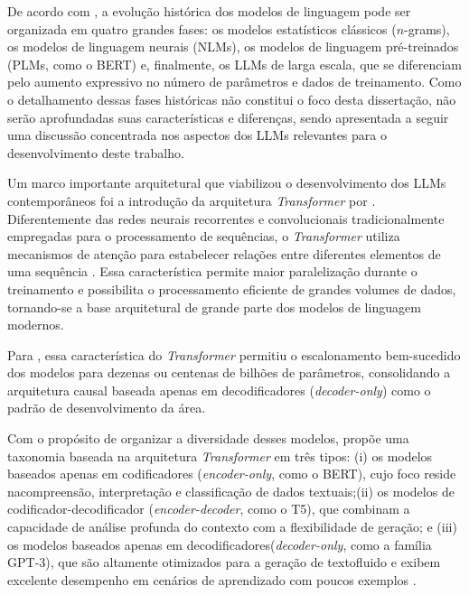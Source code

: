 De acordo com , a evolução histórica dos modelos de linguagem pode ser organizada em quatro grandes fases: os modelos estatísticos clássicos ($n$-grams), os modelos de linguagem neurais (NLMs), os modelos de linguagem pré-treinados (PLMs, como o BERT) e, finalmente, os LLMs de larga escala, que se diferenciam pelo aumento expressivo no número de parâmetros e dados de treinamento. Como o detalhamento dessas fases históricas não constitui o foco desta dissertação, não serão aprofundadas suas características e diferenças, sendo apresentada a seguir uma discussão concentrada nos aspectos dos LLMs relevantes para o desenvolvimento deste trabalho.

Um marco importante arquitetural que viabilizou o desenvolvimento dos LLMs contemporâneos foi a introdução da arquitetura \textit{Transformer} por . Diferentemente das redes neurais recorrentes e convolucionais tradicionalmente empregadas para o processamento de sequências, o \textit{Transformer} utiliza mecanismos de atenção para estabelecer relações entre diferentes elementos de uma sequência \cite{vaswani2017attention}. Essa característica permite maior paralelização durante o treinamento e possibilita o processamento eficiente de grandes volumes de dados, tornando-se a base arquitetural de grande parte dos modelos de linguagem modernos. 

Para , essa característica do \textit{Transformer} permitiu o escalonamento bem-sucedido dos modelos para dezenas ou centenas de bilhões de parâmetros, consolidando a arquitetura causal baseada apenas em decodificadores (\textit{decoder-only}) como o padrão de desenvolvimento da área.

Com o propósito de organizar a diversidade desses modelos,  propõe uma taxonomia baseada na arquitetura \textit{Transformer} em três tipos: (i) os modelos baseados apenas em codificadores (\textit{encoder-only}, como o BERT), cujo foco reside nacompreensão, interpretação e classificação de dados textuais;(ii) os modelos de codificador-decodificador (\textit{encoder-decoder}, como o T5), que combinam a capacidade de análise profunda do contexto com a flexibilidade de geração; e (iii) os modelos baseados apenas em decodificadores(\textit{decoder-only}, como a família GPT-3), que são altamente otimizados para a geração de textofluido e exibem excelente desempenho em cenários de aprendizado com poucos exemplos \cite{wang2025history}.

